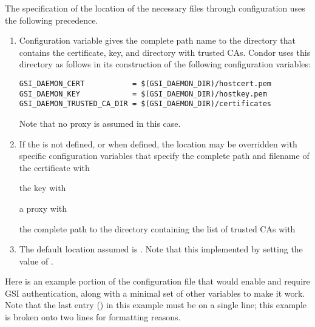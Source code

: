\begin{description}
The specification of the location of the necessary files
through configuration uses the following precedence.
\begin{enumerate}
\item
Configuration variable  gives the complete
path name to the directory that contains the certificate, key,
and directory with trusted CAs.
Condor uses this directory as follows in its construction of the following
configuration variables:
\footnotesize
\begin{verbatim}
GSI_DAEMON_CERT           = $(GSI_DAEMON_DIR)/hostcert.pem
GSI_DAEMON_KEY            = $(GSI_DAEMON_DIR)/hostkey.pem
GSI_DAEMON_TRUSTED_CA_DIR = $(GSI_DAEMON_DIR)/certificates
\end{verbatim}
\normalsize
Note that no proxy is assumed in this case.
\item
If the  is not defined, 
or when defined,
the location may be overridden with specific configuration
variables that specify the complete path and filename of 
the certificate with
the key with
a proxy with
the complete path to the directory containing the list of trusted CAs with 
\item
The default location assumed is .
Note that this implemented by setting the value of  
.
\end{enumerate}

Here is an example portion of the configuration file that would
enable and require GSI authentication,
along with a minimal set of other variables to make it work. 
Note that the last entry () in this example
must be on a single line;
this example is broken onto two lines for formatting reasons.


\end{description}
